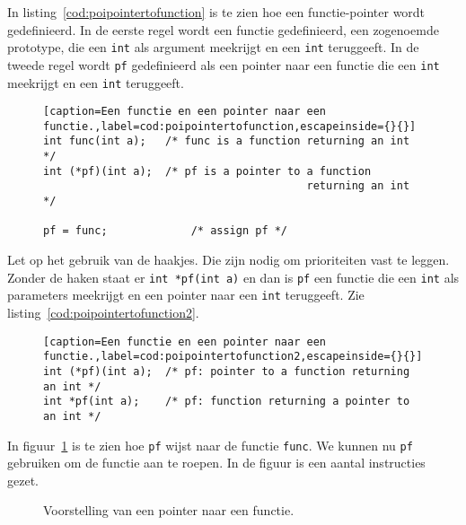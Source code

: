 In listing~\ref{cod:poipointertofunction} is te zien hoe een functie-pointer wordt gedefinieerd. In de eerste regel wordt een functie gedefinieerd, een zogenoemde prototype, die een \texttt{int} als argument meekrijgt en een \texttt{int} teruggeeft. In de tweede regel wordt \texttt{pf} gedefinieerd als een pointer naar een functie die een \texttt{int} meekrijgt en een \texttt{int} teruggeeft.

\begin{figure}[!ht]
\begin{lstlisting}[caption=Een functie en een pointer naar een functie.,label=cod:poipointertofunction,escapeinside={}{}]
int func(int a);   /* func is a function returning an int */
int (*pf)(int a);  /* pf is a pointer to a function
                                         returning an int */

pf = func;             /* assign pf */
\end{lstlisting}
\end{figure}

Let op het gebruik van de haakjes. Die zijn nodig om prioriteiten vast te leggen. Zonder de haken staat er \texttt{int *pf(int a)} en dan is \texttt{pf} een functie die een \texttt{int} als parameters meekrijgt en een pointer naar een \texttt{int} teruggeeft. Zie listing~\ref{cod:poipointertofunction2}.

\begin{figure}[H]
\begin{lstlisting}[caption=Een functie en een pointer naar een functie.,label=cod:poipointertofunction2,escapeinside={}{}]
int (*pf)(int a);  /* pf: pointer to a function returning an int */
int *pf(int a);    /* pf: function returning a pointer to an int */
\end{lstlisting}
\end{figure}

In figuur~\ref{fig:poipointertofunction} is te zien hoe \texttt{pf} wijst naar de functie \texttt{func}. We kunnen nu \texttt{pf} gebruiken om de functie aan te roepen. In de figuur is een aantal instructies gezet.

\begin{figure}[!ht]
\centering
{}
\caption{Voorstelling van een pointer naar een functie.}
\label{fig:poipointertofunction}
\end{figure}

